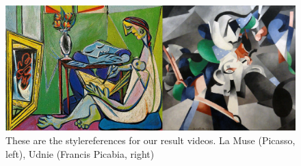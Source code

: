 \begin{figure}[!ht]
\begin{center}
\includegraphics[scale=0.3]{report/Result/images/picasso_and_udnie.png}
\caption{These are the stylereferences for our result videos. La Muse (Picasso, left), Udnie (Francis Picabia, right)}
\label{fig:architecture}
\end{center}
\end{figure}